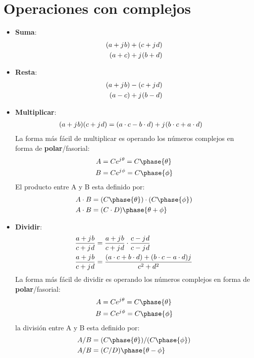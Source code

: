 \documentclass[
	12pt, %
	fleqn, %
	a4paper, %
]{LegrandOrangeBook}
\begin{document}
\section{Operaciones con complejos}
\begin{itemize}
\item \textbf{Suma}:
\begin{align*}
(a+{j\mkern1mu} b)&+(c+{j\mkern1mu} d)\\
(a+c)&+{j\mkern1mu}(b+d)
\end{align*}
\item \textbf{Resta}:
\begin{align*}
(a+{j\mkern1mu} b)&-(c+{j\mkern1mu} d)\\
(a-c)&+{j\mkern1mu}(b-d)
\end{align*}
\item \textbf{Multiplicar}:
\begin{align*}
(a+{j\mkern1mu} b)(c+{j\mkern1mu} d)&=(a\cdot c-b\cdot d)+{j\mkern1mu}(b\cdot c+a\cdot d)
\end{align*}
La forma más fácil de multiplicar es operando los números complejos en forma de \textbf{polar}/fasorial:
\begin{align*}
A&=Ce^{\iu\theta}=C\phase{\theta}\\
B&=Ce^{\iu\phi}=C\phase{\phi}\\
\end{align*}
El producto entre A y B esta definido por:
\begin{align*}
A\cdot B&=(C\phase{\theta})\cdot(C\phase{\phi})\\
A\cdot B&=(C\cdot D)\phase{\theta+\phi}
\end{align*}
\item \textbf{Dividir}:
\begin{align*}
\frac{a+{j\mkern1mu} b}{c+{j\mkern1mu} d}&=\frac{a+{j\mkern1mu} b}{c+{j\mkern1mu} d}\cdot\frac{c-{j\mkern1mu} d}{c-{j\mkern1mu} d}\\
\frac{a+{j\mkern1mu} b}{c+{j\mkern1mu} d}&=\frac{(a\cdot c+b\cdot d)+(b\cdot c-a\cdot d){j\mkern1mu}}{c^2+d^2}
\end{align*}
La forma más fácil de dividir es operando los números complejos en forma de \textbf{polar}/fasorial:
\begin{align*}
A&=Ce^{\iu\theta}=C\phase{\theta}\\
B&=Ce^{\iu\phi}=C\phase{\phi}\\
\end{align*}
la división entre A y B esta definido por:
\begin{align*}
A/B&=(C\phase{\theta})/(C\phase{\phi})\\
A/B&=(C/D)\phase{\theta-\phi}
\end{align*}

\end{itemize}
\end{document}
